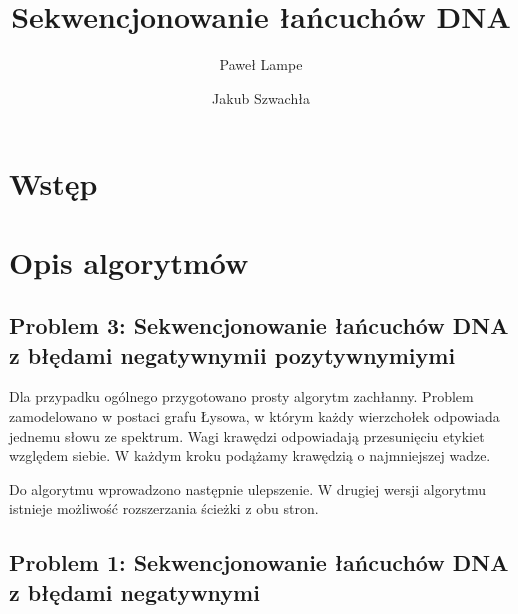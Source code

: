 \documentclass[a4paper]{article}
\title{Sekwencjonowanie łańcuchów DNA}
\date{}
\author{Paweł Lampe \and Jakub Szwachła}
\begin{document}
\maketitle

\section{Wstęp}

\section{Opis algorytmów}

\subsection{Problem 3: Sekwencjonowanie łańcuchów DNA z błędami
negatywnymii pozytywnymiymi}

Dla przypadku ogólnego przygotowano prosty algorytm zachłanny. Problem
zamodelowano w postaci grafu Łysowa, w którym każdy wierzchołek
odpowiada jednemu słowu ze spektrum. Wagi krawędzi odpowiadają
przesunięciu etykiet względem siebie. W każdym kroku podążamy krawędzią
o najmniejszej wadze.

Do algorytmu wprowadzono następnie ulepszenie. W drugiej wersji
algorytmu istnieje możliwość rozszerzania ścieżki z obu stron.


\subsection{Problem 1: Sekwencjonowanie łańcuchów DNA z błędami
negatywnymi}
\end{document}
